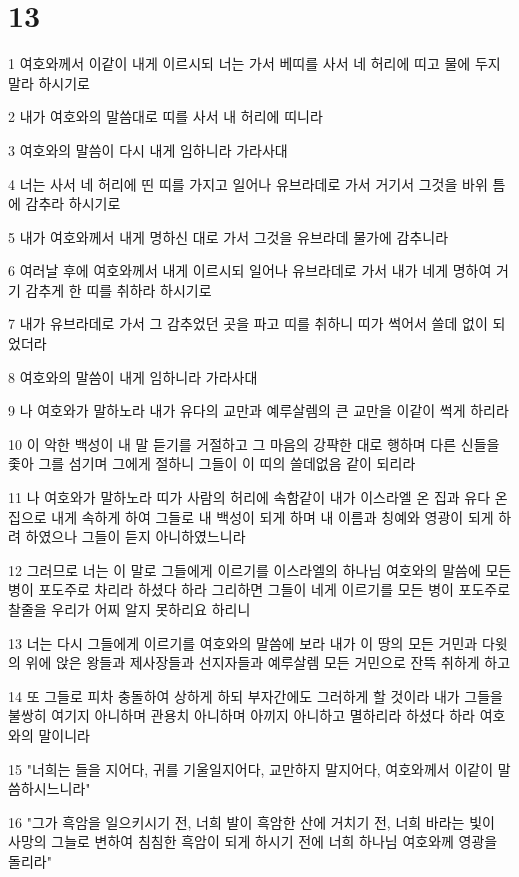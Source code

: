 \chapter{13}

\par 1 여호와께서 이같이 내게 이르시되 너는 가서 베띠를 사서 네 허리에 띠고 물에 두지 말라 하시기로
\par 2 내가 여호와의 말씀대로 띠를 사서 내 허리에 띠니라
\par 3 여호와의 말씀이 다시 내게 임하니라 가라사대
\par 4 너는 사서 네 허리에 띤 띠를 가지고 일어나 유브라데로 가서 거기서 그것을 바위 틈에 감추라 하시기로
\par 5 내가 여호와께서 내게 명하신 대로 가서 그것을 유브라데 물가에 감추니라
\par 6 여러날 후에 여호와께서 내게 이르시되 일어나 유브라데로 가서 내가 네게 명하여 거기 감추게 한 띠를 취하라 하시기로
\par 7 내가 유브라데로 가서 그 감추었던 곳을 파고 띠를 취하니 띠가 썩어서 쓸데 없이 되었더라
\par 8 여호와의 말씀이 내게 임하니라 가라사대
\par 9 나 여호와가 말하노라 내가 유다의 교만과 예루살렘의 큰 교만을 이같이 썩게 하리라
\par 10 이 악한 백성이 내 말 듣기를 거절하고 그 마음의 강퍅한 대로 행하며 다른 신들을 좇아 그를 섬기며 그에게 절하니 그들이 이 띠의 쓸데없음 같이 되리라
\par 11 나 여호와가 말하노라 띠가 사람의 허리에 속함같이 내가 이스라엘 온 집과 유다 온 집으로 내게 속하게 하여 그들로 내 백성이 되게 하며 내 이름과 칭예와 영광이 되게 하려 하였으나 그들이 듣지 아니하였느니라
\par 12 그러므로 너는 이 말로 그들에게 이르기를 이스라엘의 하나님 여호와의 말씀에 모든 병이 포도주로 차리라 하셨다 하라 그리하면 그들이 네게 이르기를 모든 병이 포도주로 찰줄을 우리가 어찌 알지 못하리요 하리니
\par 13 너는 다시 그들에게 이르기를 여호와의 말씀에 보라 내가 이 땅의 모든 거민과 다윗의 위에 앉은 왕들과 제사장들과 선지자들과 예루살렘 모든 거민으로 잔뜩 취하게 하고
\par 14 또 그들로 피차 충돌하여 상하게 하되 부자간에도 그러하게 할 것이라 내가 그들을 불쌍히 여기지 아니하며 관용치 아니하며 아끼지 아니하고 멸하리라 하셨다 하라 여호와의 말이니라
\par 15 "너희는 들을 지어다, 귀를 기울일지어다, 교만하지 말지어다, 여호와께서 이같이 말씀하시느니라"
\par 16 "그가 흑암을 일으키시기 전, 너희 발이 흑암한 산에 거치기 전, 너희 바라는 빛이 사망의 그늘로 변하여 침침한 흑암이 되게 하시기 전에 너희 하나님 여호와께 영광을 돌리라"
